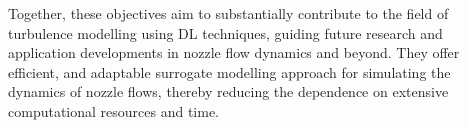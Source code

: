 Together, these objectives aim to substantially contribute to the field of turbulence modelling using DL techniques, guiding future research and application developments in nozzle flow dynamics and beyond. They offer efficient, and adaptable surrogate modelling approach for simulating the dynamics of nozzle flows, thereby reducing the dependence on extensive computational resources and time.